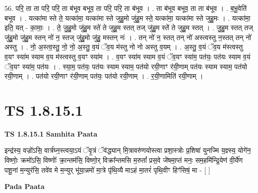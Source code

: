 \documentclass[17pt]{extarticle}
\begin{document}
56. परि॒ ता ता परि॒ परि॒ ता ब॑भूव बभूव॒ ता परि॒ परि॒ ता ब॑भूव । . ता ब॑भूव बभूव॒ ता ता ब॑भूव । . ब॒भू॒वेति॑ बभूव । . यत्का॑मा स्ते ते॒ यत्का॑मा॒ यत्का॑मा स्ते जुहु॒मो जु॑हु॒म स्ते॒ यत्का॑मा॒ यत्का॑मा स्ते जुहु॒मः । . यत्का॑मा॒ इति॒ यत् - का॒माः॒ । . ते॒ जु॒हु॒मो जु॑हु॒म स्ते॑ ते जुहु॒म स्तत् तज् जु॑हु॒म स्ते॑ ते जुहु॒म स्तत् । . जु॒हु॒म स्तत् तज् जु॑हु॒मो जु॑हु॒म स्तन् नो॑ न॒ स्तज् जु॑हु॒मो जु॑हु॒ मस्तन् नः॑ । . तन् नो॑ न॒ स्तत् तन् नो॑ अस्त्वस्तु न॒स्तत् तन् नो॑ अस्तु । . नो॒ अ॒स्त्व॒स्तु॒ नो॒ नो॒ अ॒स्तु॒ व॒यं ॅव॒य म॑स्तु नो नो अस्तु व॒यम् । . अ॒स्तु॒ व॒यं ॅव॒य म॑स्त्वस्तु व॒यꣳ स्या॑म स्याम व॒य म॑स्त्वस्तु व॒यꣳ स्या॑म । . व॒यꣳ स्या॑म स्याम व॒यं ॅव॒यꣳ स्या॑म॒ पत॑यः॒ पत॑यः स्याम व॒यं ॅव॒यꣳ स्या॑म॒ पत॑यः । . स्या॒म॒ पत॑यः॒ पत॑यः स्याम स्याम॒ पत॑यो रयी॒णाꣳ र॑यी॒णाम् पत॑यः स्याम स्याम॒ पत॑यो रयी॒णाम् । . पत॑यो रयी॒णाꣳ र॑यी॒णाम् पत॑यः॒ पत॑यो रयी॒णाम् । . र॒यी॒णामिति॑ रयी॒णाम् । \newline
\pagebreak
{}

\section{ TS 1.8.15.1 }

\textbf{TS 1.8.15.1 } \newline
\textbf{Samhita Paata} \newline

इन्द्र॑स्य॒ वज्रो॑ऽसि॒ वार्त्र॑घ्न॒स्त्वया॒ऽयं ॅवृ॒त्रं ॅव॑द्ध्यान् मि॒त्रावरु॑णयोस्त्वा प्रशा॒स्त्रोः प्र॒शिषा॑ युनज्मि य॒ज्ञ्स्य॒ योगे॑न॒ विष्णोः॒ क्रमो॑ऽसि॒ विष्णोः᳚ क्रा॒न्तम॑सि॒ विष्णो॒र् विक्रा᳚न्तमसि म॒रुतां᳚ प्रस॒वे जे॑षमा॒प्तं मनः॒ सम॒हमि॑न्द्रि॒येण॑ वी॒र्ये॑ण पशू॒नां म॒न्युर॑सि॒ तवे॑व मे म॒न्युर् भू॑या॒न्नमो॑ मा॒त्रे पृ॑थि॒व्यै माऽहं मा॒तरं॑ पृथि॒वीꣳ हिꣳ॑सिषं॒ मा - [ ] \newline

\textbf{Pada Paata} \newline
\end{document}
